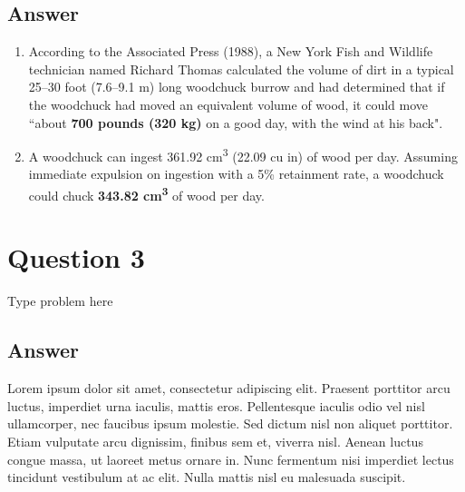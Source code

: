 \documentclass[
	12pt, %
]{fphw}
\begin{document}

\subsection{Answer}

\begin{enumerate} %
	\item According to the Associated Press (1988), a New York Fish and Wildlife technician named Richard Thomas calculated the volume of dirt in a typical 25--30 foot (7.6--9.1 m) long woodchuck burrow and had determined that if the woodchuck had moved an equivalent volume of wood, it could move ``about \textbf{700 pounds (320 kg)} on a good day, with the wind at his back".
    
	\item A woodchuck can ingest 361.92 cm\textsuperscript{3} (22.09 cu in) of wood per day. Assuming immediate expulsion on ingestion with a 5\% retainment rate, a woodchuck could chuck \textbf{343.82 cm\textsuperscript{3}} of wood per day.
\end{enumerate}


\section{Question 3}

\begin{problem}
Type problem here
\end{problem}


\subsection{Answer} 

Lorem ipsum dolor sit amet, consectetur adipiscing elit. Praesent porttitor arcu luctus, imperdiet urna iaculis, mattis eros. Pellentesque iaculis odio vel nisl ullamcorper, nec faucibus ipsum molestie. Sed dictum nisl non aliquet porttitor. Etiam vulputate arcu dignissim, finibus sem et, viverra nisl. Aenean luctus congue massa, ut laoreet metus ornare in. Nunc fermentum nisi imperdiet lectus tincidunt vestibulum at ac elit. Nulla mattis nisl eu malesuada suscipit.
\end{document}
